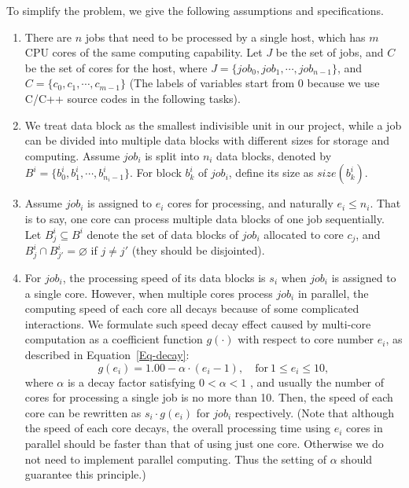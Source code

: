 \documentclass{llncs}
\begin{document}
To simplify the problem, we give the following assumptions and specifications.

\begin{enumerate}

  \item There are $n$ jobs that need to be processed by a single host, which has $m$ CPU cores of the same computing capability. Let $J$ be the set of jobs, and $C$ be the set of cores for the host, where $J = \{job_0, job_1, \cdots, job_{n-1}\}$, and $C = \{c_0, c_1, \cdots, c_{m-1}\}$ (The labels of variables start from 0 because we use C/C++ source codes in the following tasks).

  \vspace{2mm}

  \item We treat data block as the smallest indivisible unit in our project, while a job can be divided into multiple data blocks with different sizes for storage and computing. Assume $job_i$ is split into $n_i$ data blocks, denoted by $B^i = \{b^i_{0}, b^i_{1}, \cdots, b^i_{n_i-1}\}$. For block $b^i_{k}$ of $job_i$, define its size as $size(b^i_{k})$.

  \vspace{2mm}

  \item Assume $job_i$ is assigned to $e_i$ cores for processing, and naturally $e_i \leq n_i$. That is to say, one core can process multiple data blocks of one job sequentially. Let $B^i_{j}\subseteq B^i$ denote the set of data blocks of $job_i$ allocated to core $c_j$, and $B^i_{j} \cap B^i_{j'} = \varnothing$ if $j \neq j'$ (they should be disjointed).

  \vspace{2mm}

  \item For $job_i$, the processing speed of its data blocks is $s_i$ when $job_i$ is assigned to a single core. However, when multiple cores process $job_i$ in parallel, the computing speed of each core all decays because of some complicated interactions. We formulate such speed decay effect caused by multi-core computation as a coefficient function $g(\cdot)$ with respect to core number $e_i$, as described in Equation~\eqref{Eq-decay}:
    \begin{equation} \label{Eq-decay}
    g (e_i) = 1.00 - \alpha \cdot (e_i-1), \quad  \text{for} \ 1 \leq e_i \leq 10,
    \end{equation}
  where $\alpha$ is a decay factor satisfying $0 < \alpha < 1$ , and usually the number of cores for processing a single job is no more than 10. Then, the speed of each core can be rewritten as $s_i \cdot g(e_i)$ for $job_i$ respectively. (Note that although the speed of each core decays, the overall processing time using $e_i$ cores in parallel should be faster than that of using just one core. Otherwise we do not need to implement parallel computing. Thus the setting of $\alpha$ should guarantee this principle.)


\end{enumerate}
\end{document}
